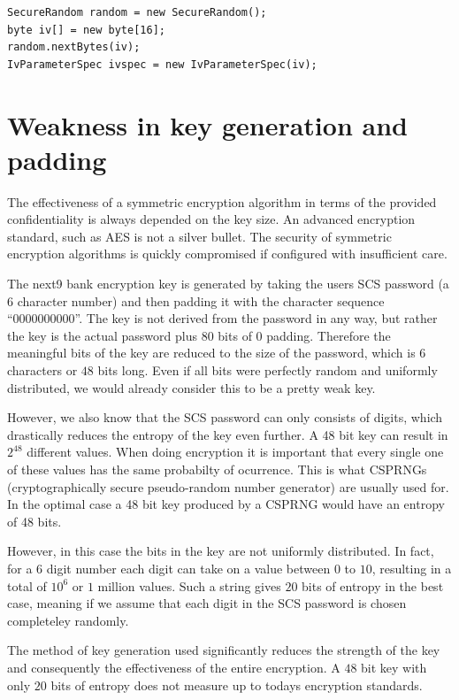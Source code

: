 \begin{lstlisting}[caption= Java IV generation,label=listing:javaiv]
SecureRandom random = new SecureRandom();
byte iv[] = new byte[16];
random.nextBytes(iv);
IvParameterSpec ivspec = new IvParameterSpec(iv);
\end{lstlisting}

\chapter{Weakness in key generation and padding}
\label{chapter:weak_key}

The effectiveness of a symmetric encryption algorithm in terms of the provided confidentiality is always depended on the key size. An advanced encryption standard, such as AES is not a silver bullet. The security of symmetric encryption algorithms is quickly compromised if configured with insufficient care.


The next9 bank encryption key is generated by taking the users SCS password (a $6$ character number) and then padding it with the character sequence ``0000000000''. The key is not derived from the password in any way, but rather the key is the actual password plus $80$ bits of $0$ padding. Therefore the meaningful bits of the key are reduced to the size of the password, which is $6$ characters or $48$ bits long. Even if all bits were perfectly random and uniformly distributed, we would already consider this to be a pretty weak key.

However, we also know that the SCS password can only consists of digits, which drastically reduces the entropy of the key even further. A 48 bit key can result in $2^{48}$ different values. When doing encryption it is important that every single one of these values has the same probabilty of ocurrence. This is what CSPRNGs (cryptographically secure pseudo-random number generator) are usually used for.  In the optimal case a 48 bit key produced by a CSPRNG would have an entropy of 48 bits.

However, in this case the bits in the key are not uniformly distributed. In fact, for a 6 digit number each digit can take on a value between $0$ to $10$, resulting in a total of $10^6$ or $1$ million values. Such a string gives $20$ bits of entropy in the best case, meaning if we assume that each digit in the SCS password is chosen completeley randomly. 

The method of key generation used significantly reduces the strength of the key and consequently the effectiveness of the entire encryption. A $48$ bit key with only $20$ bits of entropy does not measure up to todays encryption standards. 

